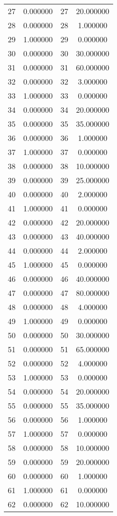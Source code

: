 \documentclass[12pt]{article}
\begin{document}
\begin{longtable}{@{}cccc@{}}
27 & 0.000000 & 27 & 20.000000 \\
28 & 0.000000 & 28 & 1.000000 \\
29 & 1.000000 & 29 & 0.000000 \\
30 & 0.000000 & 30 & 30.000000 \\
31 & 0.000000 & 31 & 60.000000 \\
32 & 0.000000 & 32 & 3.000000 \\
33 & 1.000000 & 33 & 0.000000 \\
34 & 0.000000 & 34 & 20.000000 \\
35 & 0.000000 & 35 & 35.000000 \\
36 & 0.000000 & 36 & 1.000000 \\
37 & 1.000000 & 37 & 0.000000 \\
38 & 0.000000 & 38 & 10.000000 \\
39 & 0.000000 & 39 & 25.000000 \\
40 & 0.000000 & 40 & 2.000000 \\
41 & 1.000000 & 41 & 0.000000 \\
42 & 0.000000 & 42 & 20.000000 \\
43 & 0.000000 & 43 & 40.000000 \\
44 & 0.000000 & 44 & 2.000000 \\
45 & 1.000000 & 45 & 0.000000 \\
46 & 0.000000 & 46 & 40.000000 \\
47 & 0.000000 & 47 & 80.000000 \\
48 & 0.000000 & 48 & 4.000000 \\
49 & 1.000000 & 49 & 0.000000 \\
50 & 0.000000 & 50 & 30.000000 \\
51 & 0.000000 & 51 & 65.000000 \\
52 & 0.000000 & 52 & 4.000000 \\
53 & 1.000000 & 53 & 0.000000 \\
54 & 0.000000 & 54 & 20.000000 \\
55 & 0.000000 & 55 & 35.000000 \\
56 & 0.000000 & 56 & 1.000000 \\
57 & 1.000000 & 57 & 0.000000 \\
58 & 0.000000 & 58 & 10.000000 \\
59 & 0.000000 & 59 & 20.000000 \\
60 & 0.000000 & 60 & 1.000000 \\
61 & 1.000000 & 61 & 0.000000 \\
62 & 0.000000 & 62 & 10.000000 \\

\end{longtable}
\end{document}
